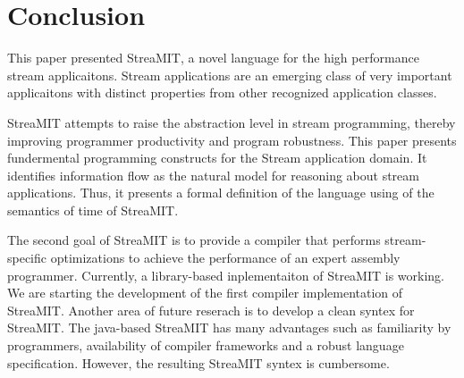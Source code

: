 \section{Conclusion}
\label{sec:conc}
This paper presented StreaMIT, a novel language for the high
performance stream applicaitons.
Stream applications are an emerging class of very important
applicaitons with distinct properties from other recognized
application classes.

StreaMIT attempts to raise the abstraction level in stream
programming, thereby improving programmer productivity and program
robustness. This paper presents fundermental programming constructs
for the Stream application domain. It identifies information flow as
the natural model for reasoning about stream applications. Thus, it
presents a formal definition of the language using of the semantics of
time of StreaMIT. 

The second goal of StreaMIT is to provide a compiler that performs
stream-specific optimizations to achieve the performance of an expert
assembly programmer. Currently, a library-based inplementaiton of
StreaMIT is working. We are starting the development of the first
compiler implementation of StreaMIT. Another area of future reserach
is to develop a clean syntex for StreaMIT. The java-based StreaMIT has
many advantages such as familiarity by programmers, availability of
compiler frameworks and a robust language specification. However, the
resulting StreaMIT syntex is cumbersome.
